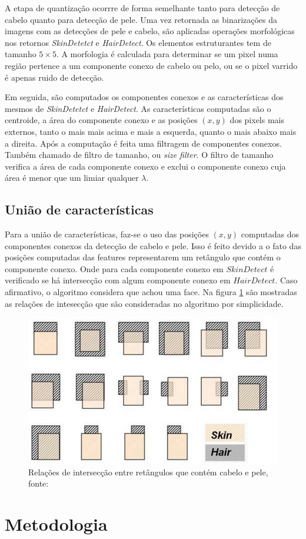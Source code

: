 \documentclass[journal,onecolumn]{IEEEtran}
\begin{document}
	A etapa de quantização ocorrre de forma semelhante tanto para detecção de cabelo quanto para detecção de pele.
	Uma vez retornada as binarizações da imagens com as detecções de pele e cabelo, são aplicadas operações morfológicas nos retornos \textit{SkinDetetct} e \textit{HairDetect}.
 	Os elementos estruturantes tem de tamanho $5\times 5$.
	A morfologia é calculada para determinar se um pixel numa região pertence a um componente conexo de cabelo ou pelo, ou se o pixel varrido é apenas ruido de detecção.
	
	Em seguida, são computados os componentes conexos e as características dos mesmos de \textit{SkinDetetct} e \textit{HairDetect}.
	As características computadas são o centroide, a área do componente conexo e as posições $(x,y)$ dos pixels mais externos, tanto o mais mais acima e mais a esquerda, quanto o mais abaixo mais a direita.
	Após a computação é feita uma filtragem de componentes conexos.
	Também chamado de filtro de tamanho, ou \textit{size filter}.
	O filtro de tamanho verifica a área de cada componente conexo e exclui o componente conexo cuja área é menor que um limiar qualquer $\lambda$.
	
	\subsection{União de características}	
	
	Para a união de características, faz-se o uso das posições $(x,y)$ computadas dos componentes conexos da detecção de cabelo e pele.
	Isso é feito devido a o fato das posições computadas das features representarem um retângulo que contém o componente conexo.
	Onde para cada componente conexo em $SkinDetect$ é verificado se há intersecção com algum componente conexo em $HairDetect$.
	Caso afirmativo, o algoritmo considera que achou uma face.
	Na figura \ref{fig:intesectRelations} são mostradas as relações de intesecção que são consideradas no algoritmo por simplicidade.
	\begin{figure}[htp]
	\begin{center}
		\includegraphics[scale=0.3]{intersections_skin_hair_components.png}
		\caption{Relações de intersecção entre retângulos que contém cabelo e pele, fonte:\cite{chen2007simple} }			\label{fig:intesectRelations}
	\end{center}
	\end{figure}
	
	\section{Metodologia}
	
	
	


\end{document}

